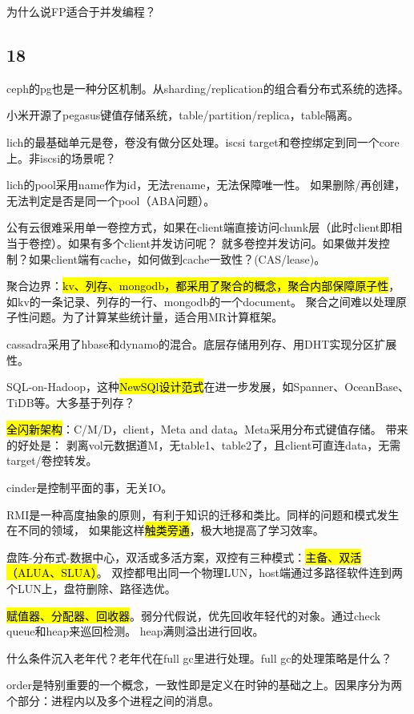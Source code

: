 为什么说FP适合于并发编程？

\subsection{18}

ceph的pg也是一种分区机制。从sharding/replication的组合看分布式系统的选择。

小米开源了pegasus键值存储系统，table/partition/replica，table隔离。

lich的最基础单元是卷，卷没有做分区处理。iscsi target和卷控绑定到同一个core上。非iscsi的场景呢？

lich的pool采用name作为id，无法rename，无法保障唯一性。
如果删除/再创建，无法判定是否是同一个pool（ABA问题）。

公有云很难采用单一卷控方式，如果在client端直接访问chunk层（此时client即相当于卷控）。如果有多个client并发访问呢？
就多卷控并发访问。如果做并发控制？如果client端有cache，如何做到cache一致性？(CAS/lease)。

聚合边界：\hl{kv、列存、mongodb，都采用了聚合的概念，聚合内部保障原子性}，如kv的一条记录、列存的一行、mongodb的一个document。
聚合之间难以处理原子性问题。为了计算某些统计量，适合用MR计算框架。

cassadra采用了hbase和dynamo的混合。底层存储用列存、用DHT实现分区扩展性。

SQL-on-Hadoop，这种\hl{NewSQl设计范式}在进一步发展，如Spanner、OceanBase、TiDB等。大多基于列存？

\hl{全闪新架构}：C/M/D，client，Meta and data。Meta采用分布式键值存储。
带来的好处是： 剥离vol元数据道M，无table1、table2了，且client可直连data，无需target/卷控转发。

cinder是控制平面的事，无关IO。

\hrulefill

RMI是一种高度抽象的原则，有利于知识的迁移和类比。同样的问题和模式发生在不同的领域，
如果能这样\hl{触类旁通}，极大地提高了学习效率。

盘阵-分布式-数据中心，双活或多活方案，双控有三种模式：\hl{主备、双活（ALUA、SLUA）}。
双控都甩出同一个物理LUN，host端通过多路径软件连到两个LUN上，盘符删除、路径选优。

\hrulefill

\hl{赋值器、分配器、回收器}。弱分代假说，优先回收年轻代的对象。通过check queue和heap来巡回检测。
heap满则溢出进行回收。

什么条件沉入老年代？老年代在full gc里进行处理。full gc的处理策略是什么？

order是特别重要的一个概念，一致性即是定义在时钟的基础之上。因果序分为两个部分：进程内以及多个进程之间的消息。

